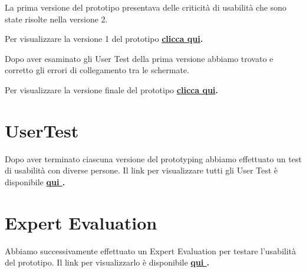 \documentclass{article}
\begin{document}
    \vspace{1cm}
    \vspace{0.5cm}
    \par La prima versione del prototipo presentava delle criticità di usabilità che sono state risolte nella versione 2.
    \par Per visualizzare la versione 1 del prototipo \textbf{\href{https://t.ly/g4ZQ}{clicca qui}.}

    \vspace{1cm}
    \vspace{0.5cm}
    \par Dopo aver esaminato gli User Test della prima versione abbiamo trovato e corretto gli errori di collegamento tra le schermate. 
    \par Per visualizzare la versione finale del prototipo \textbf{\href{https://t.ly/ecm4}{clicca qui}.}
    
\section{UserTest} \par\vspace{0.5cm}

\par Dopo aver terminato ciascuna versione del prototyping abbiamo effettuato un test di usabilità con diverse persone.
Il link per visualizzare tutti gli User Test è disponibile \textbf{\href{https://www.notion.so/User-Testing-03a9697158cb4f93b3439fe694f33ac9}{qui }.}
\section{Expert Evaluation}
\par Abbiamo successivamente effettuato un Expert Evaluation per testare l'usabilità del prototipo.
Il link per visualizzarlo è disponibile \textbf{\href{https://www.notion.so/Expert-Evaluation-7bc49cae89414742a51b71f6faebecdd}{qui }.}

\vspace{1cm}

\newpage
\end{document}
